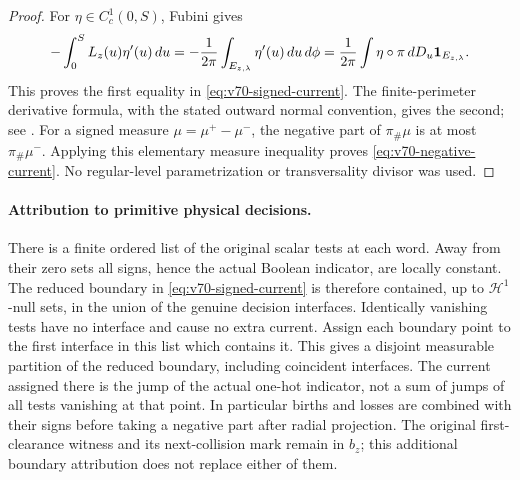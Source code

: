 \begin{proof}
For $\eta\in C_c^1(0,S)$, Fubini gives
\[
 -\int_0^S L_z(u)\eta'(u)\,du
 =-\frac1{2\pi}\int_{E_{z,\lambda}}\eta'(u)\,du\,d\phi
 =\frac1{2\pi}\int\eta\circ\pi\,dD_u\mathbf1_{E_{z,\lambda}}.
\]
This proves the first equality in \eqref{eq:v70-signed-current}.
The finite-perimeter derivative formula, with the stated outward
normal convention, gives the second; see \cite{AFP}. For a signed
measure $\mu=\mu^+-\mu^-$, the negative part of $\pi_\#\mu$
is at most $\pi_\#\mu^-$. Applying this elementary measure inequality
proves \eqref{eq:v70-negative-current}. No regular-level parametrization
or transversality divisor was used.
\end{proof}

\paragraph{Attribution to primitive physical decisions.}
There is a finite ordered list of the original scalar tests at each
word. Away from their zero sets all signs, hence the actual Boolean
indicator, are locally constant. The reduced boundary in
\eqref{eq:v70-signed-current} is therefore contained, up to
$\mathcal H^1$-null sets, in the union of the genuine decision
interfaces. Identically vanishing tests have no interface and cause
no extra current. Assign each boundary point to the first interface
in this list which contains it. This gives a disjoint measurable
partition of the reduced boundary, including coincident interfaces.
The current assigned there is the jump of the actual one-hot indicator,
not a sum of jumps of all tests vanishing at that point. In particular
births and losses are combined with their signs before taking a
negative part after radial projection. The original first-clearance
witness and its next-collision mark remain in $b_z$; this additional
boundary attribution does not replace either of them.

